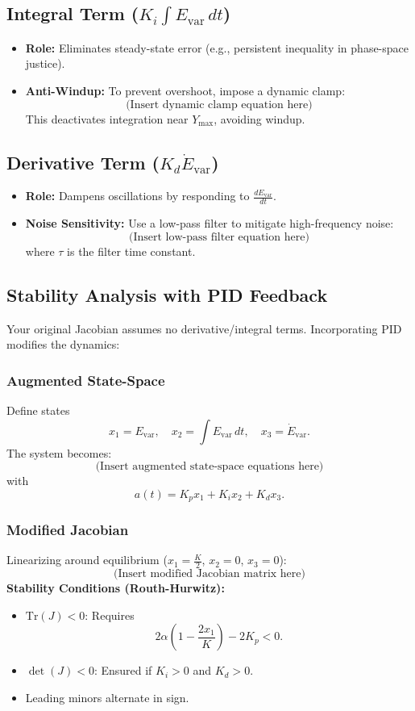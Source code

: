 \documentclass{article}
\theoremstyle{definition}
\begin{document}
\subsection{Integral Term ($K_i \int E_{\text{var}} \, dt$)}
\begin{itemize}
    \item \textbf{Role:} Eliminates steady-state error (e.g., persistent inequality in phase-space justice).
    \item \textbf{Anti-Windup:} To prevent overshoot, impose a dynamic clamp:
    \[
    \text{(Insert dynamic clamp equation here)}
    \]
    This deactivates integration near $Y_{\text{max}}$, avoiding windup.
\end{itemize}

\subsection{Derivative Term ($K_d \dot{E}_{\text{var}}$)}
\begin{itemize}
    \item \textbf{Role:} Dampens oscillations by responding to $\frac{dE_{\text{var}}}{dt}$.
    \item \textbf{Noise Sensitivity:} Use a low-pass filter to mitigate high-frequency noise:
    \[
    \text{(Insert low-pass filter equation here)}
    \]
    where $\tau$ is the filter time constant.
\end{itemize}

\subsection{Stability Analysis with PID Feedback}
Your original Jacobian assumes no derivative/integral terms. Incorporating PID modifies the dynamics:

\subsubsection{Augmented State-Space}
Define states 
\[
x_1 = E_{\text{var}}, \quad x_2 = \int E_{\text{var}}\, dt, \quad x_3 = \dot{E}_{\text{var}}.
\]
The system becomes:
\[
\text{(Insert augmented state-space equations here)}
\]
with 
\[
a(t) = K_p x_1 + K_i x_2 + K_d x_3.
\]

\subsubsection{Modified Jacobian}
Linearizing around equilibrium ($x_1 = \frac{K}{2}$, $x_2 = 0$, $x_3 = 0$):
\[
\text{(Insert modified Jacobian matrix here)}
\]
\textbf{Stability Conditions (Routh-Hurwitz):}
\begin{itemize}
    \item $\mathrm{Tr}(J) < 0$: Requires 
    \[
    2\alpha\left(1 - \frac{2x_1}{K}\right) - 2K_p < 0.
    \]
    \item $\det(J) < 0$: Ensured if $K_i > 0$ and $K_d > 0$.
    \item Leading minors alternate in sign.
\end{itemize}
\end{document}
